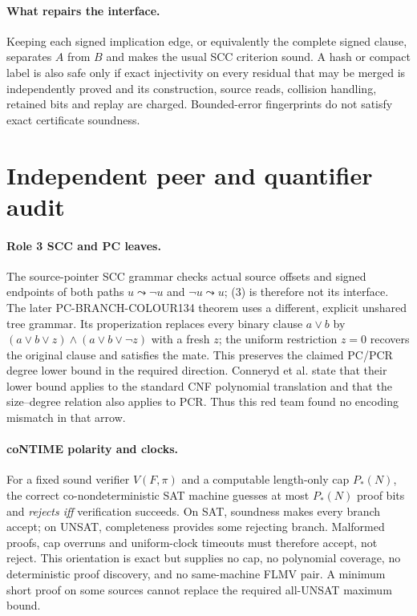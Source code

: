 \documentclass[11pt]{article}
\begin{document}
\paragraph{What repairs the interface.}
Keeping each signed implication edge, or equivalently the complete signed clause, separates
$A$ from $B$ and makes the usual SCC criterion sound.  A hash or compact label is also safe
only if exact injectivity on every residual that may be merged is independently proved and
its construction, source reads, collision handling, retained bits and replay are charged.
Bounded-error fingerprints do not satisfy exact certificate soundness.

\section{Independent peer and quantifier audit}
\paragraph{Role 3 SCC and PC leaves.}
The source-pointer SCC grammar checks actual source offsets and signed endpoints of both
paths $u\leadsto\neg u$ and $\neg u\leadsto u$; (3) is therefore not its interface.
The later PC-BRANCH-COLOUR134 theorem uses a different, explicit unshared tree grammar.
Its properization replaces every binary clause $a\vee b$ by
$(a\vee b\vee z)\wedge(a\vee b\vee\neg z)$ with a fresh $z$; the uniform
restriction $z=0$ recovers the original clause and satisfies the mate.  This preserves the
claimed PC/PCR degree lower bound in the required direction.  Conneryd et al. state that their
lower bound applies to the standard CNF polynomial translation and that the size--degree
relation also applies to PCR.  Thus this red team found no encoding mismatch in that arrow.

\paragraph{coNTIME polarity and clocks.}
For a fixed sound verifier $V(F,\pi)$ and a computable length-only cap $P_*(N)$, the correct
co-nondeterministic SAT machine guesses at most $P_*(N)$ proof bits and \emph{rejects iff}
verification succeeds.  On SAT, soundness makes every branch accept; on UNSAT, completeness
provides some rejecting branch.  Malformed proofs, cap overruns and uniform-clock timeouts must
therefore accept, not reject.  This orientation is exact but supplies no cap, no polynomial
coverage, no deterministic proof discovery, and no same-machine FLMV pair.  A minimum short
proof on some sources cannot replace the required all-UNSAT maximum bound.
\end{document}
